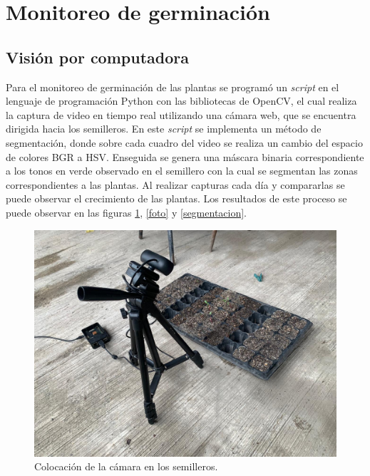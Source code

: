 \section{Monitoreo de germinación}

\subsection{Visión por computadora}
Para el monitoreo de germinación de las plantas se programó un \textit{script} en el lenguaje de programación Python con las bibliotecas de OpenCV, el cual realiza la captura de video en tiempo real utilizando una cámara web, que se encuentra dirigida hacia los semilleros. En este \textit{script} se implementa un método de segmentación, donde sobre cada cuadro del video se realiza un cambio del espacio de colores BGR a HSV. Enseguida se genera una máscara binaria correspondiente a los tonos en verde observado en el semillero con la cual se segmentan las zonas correspondientes a las plantas. Al realizar capturas cada día y compararlas se puede observar el crecimiento de las plantas. Los resultados de este proceso se puede observar en las figuras \ref{cam}, \ref{foto} y \ref{segmentacion}.

\begin{figure}[H]
\centering
         \includegraphics[scale=0.2]{imgs/Camara.jpg}
    \caption{Colocación de la cámara en los semilleros.}\label{cam}
\end{figure}

